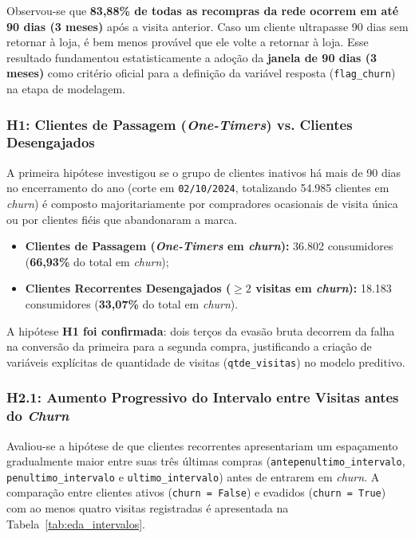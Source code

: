 Observou-se que \textbf{83,88\% de todas as recompras da rede ocorrem em até 90 dias (3 meses)} após a visita anterior. 
Caso um cliente ultrapasse 90 dias sem retornar à loja, é bem menos provável que ele volte a retornar à loja. 
Esse resultado fundamentou estatisticamente a adoção da \textbf{janela de 90 dias (3 meses)} como critério oficial para a definição da variável resposta (\texttt{flag\_churn}) na etapa de modelagem.

\subsubsection{H1: Clientes de Passagem (\textit{One-Timers}) vs. Clientes Desengajados}
A primeira hipótese investigou se o grupo de clientes inativos há mais de 90 dias no encerramento do ano (corte em \texttt{02/10/2024}, totalizando 54.985 clientes em \textit{churn}) é composto majoritariamente por compradores ocasionais de visita única ou por clientes fiéis que abandonaram a marca.
\begin{itemize}[leftmargin=*]
    \item \textbf{Clientes de Passagem (\textit{One-Timers} em \textit{churn}):} 36.802 consumidores (\textbf{66,93\%} do total em \textit{churn});
    \item \textbf{Clientes Recorrentes Desengajados ($\ge 2$ visitas em \textit{churn}):} 18.183 consumidores (\textbf{33,07\%} do total em \textit{churn}).
\end{itemize}
A hipótese \textbf{H1 foi confirmada}: dois terços da evasão bruta decorrem da falha na conversão da primeira para a segunda compra, justificando a criação de variáveis explícitas de quantidade de visitas (\texttt{qtde\_visitas}) no modelo preditivo.

\subsubsection{H2.1: Aumento Progressivo do Intervalo entre Visitas antes do \textit{Churn}}
Avaliou-se a hipótese de que clientes recorrentes apresentariam um espaçamento gradualmente maior entre suas três últimas compras (\texttt{antepenultimo\_intervalo}, \texttt{penultimo\_intervalo} e \texttt{ultimo\_intervalo}) antes de entrarem em \textit{churn}. 
A comparação entre clientes ativos (\texttt{churn = False}) e evadidos (\texttt{churn = True}) com ao menos quatro visitas registradas é apresentada na Tabela~\ref{tab:eda_intervalos}.

